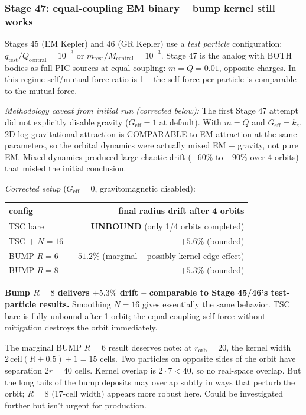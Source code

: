 \documentclass[11pt,a4paper]{article}
\begin{document}
\subsubsection*{Stage 47: equal-coupling EM binary -- bump kernel still works}

Stages 45 (EM Kepler) and 46 (GR Kepler) use a \emph{test particle}
configuration: $q_{\mathrm{test}}/Q_{\mathrm{central}} = 10^{-3}$ or
$m_{\mathrm{test}}/M_{\mathrm{central}} = 10^{-3}$.  Stage 47 is the
analog with BOTH bodies as full PIC sources at equal coupling:
$m = Q = 0.01$, opposite charges.  In this regime self/mutual force
ratio is 1 -- the self-force per particle is comparable to the
mutual force.

\emph{Methodology caveat from initial run (corrected below):}  The
first Stage 47 attempt did not explicitly disable gravity ($G_{\mathrm{eff}}=1$
at default).  With $m = Q$ and $G_{\mathrm{eff}} = k_e$, 2D-log
gravitational attraction is COMPARABLE to EM attraction at the same
parameters, so the orbital dynamics were actually mixed EM + gravity,
not pure EM.  Mixed dynamics produced large chaotic drift ($-60\%$ to
$-90\%$ over 4 orbits) that misled the initial conclusion.

\emph{Corrected setup} ($G_{\mathrm{eff}} = 0$, gravitomagnetic disabled):

\begin{center}
\begin{tabular}{lr}
\toprule
config & final radius drift after 4 orbits \\
\midrule
TSC bare      & \textbf{UNBOUND} (only 1/4 orbits completed) \\
TSC $+$ $N=16$ & $+5.6\%$ (bounded) \\
BUMP $R=6$    & $-51.2\%$ (marginal -- possibly kernel-edge effect) \\
BUMP $R=8$    & $+5.3\%$ (bounded) \\
\bottomrule
\end{tabular}
\end{center}

\textbf{Bump $R=8$ delivers $+5.3\%$ drift -- comparable to Stage 45/46's
test-particle results.}  Smoothing $N=16$ gives essentially the same
behavior.  TSC bare is fully unbound after 1 orbit; the equal-coupling
self-force without mitigation destroys the orbit immediately.

The marginal BUMP $R=6$ result deserves note: at $r_{\mathrm{orb}}=20$,
the kernel width $2\,\mathrm{ceil}(R+0.5)+1 = 15$ cells.  Two particles
on opposite sides of the orbit have separation $2r = 40$ cells.  Kernel
overlap is $2\cdot 7 < 40$, so no real-space overlap.  But the long
tails of the bump deposits may overlap subtly in ways that perturb the
orbit; $R=8$ (17-cell width) appears more robust here.  Could be
investigated further but isn't urgent for production.
\end{document}
